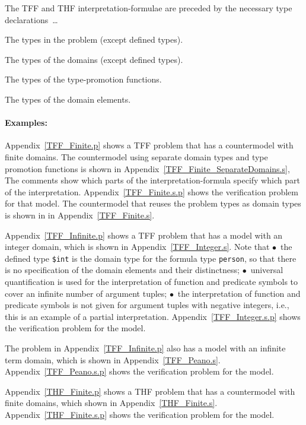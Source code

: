\documentclass{easychair}
\newcommand{\smalltt}[1]{\small \texttt{#1}}
\newenvironment{packed_itemize}{
\vspace*{-0.3em}
\begin{itemize}
\setlength{\partopsep}{0pt}
\setlength{\itemsep}{1pt}
\setlength{\parskip}{0pt}
\setlength{\parsep}{0pt}
}{\end{itemize}}
\begin{document}
\vspace*{0.5em}
The TFF and THF interpretation-formulae are preceded by the necessary type declarations~\ldots
\begin{packed_itemize}
\item The types in the problem (except defined types).
\item The types of the domains (except defined types).
\item The types of the type-promotion functions.
\item The types of the domain elements.
\end{packed_itemize}

\paragraph{Examples:}
\begin{packed_itemize}
\item Appendix~\ref{TFF_Finite.p} shows a TFF problem that has a countermodel with finite domains.
      The countermodel using separate domain types and type promotion functions is shown in 
      Appendix~\ref{TFF_Finite_SeparateDomains.s},
      The comments show which parts of the interpretation-formula specify which part of the 
      interpretation.
      Appendix~\ref{TFF_Finite.s.p} shows the verification problem for that model.
      The countermodel that reuses the problem types as domain types is shown in in 
      Appendix~\ref{TFF_Finite.s}.
\item Appendix~\ref{TFF_Infinite.p} shows a TFF problem that has a model with an integer domain,
      which is shown in Appendix~\ref{TFF_Integer.s}.
      Note that $\bullet$~the defined type {\smalltt{\$int}} is the domain type for the formula 
      type {\smalltt{person}}, so that there is no specification of the domain elements and their 
      distinctness; $\bullet$~universal quantification is used for the interpretation of function 
      and predicate symbols to cover an infinite number of argument tuples; $\bullet$~the 
      interpretation of function and predicate symbols is not given for argument tuples with 
      negative integers, i.e., this is an example of a partial interpretation.
      Appendix~\ref{TFF_Integer.s.p} shows the verification problem for the model.
\item The problem in Appendix~\ref{TFF_Infinite.p} also has a model with an infinite term domain,
      which is shown in Appendix~\ref{TFF_Peano.s}.
      Appendix~\ref{TFF_Peano.s.p} shows the verification problem for the model.
\item Appendix~\ref{THF_Finite.p} shows a THF problem that has a countermodel with finite domains,
      which shown in Appendix~\ref{THF_Finite.s}.
      Appendix~\ref{THF_Finite.s.p} shows the verification problem for the model.
\end{packed_itemize}
\end{document}
